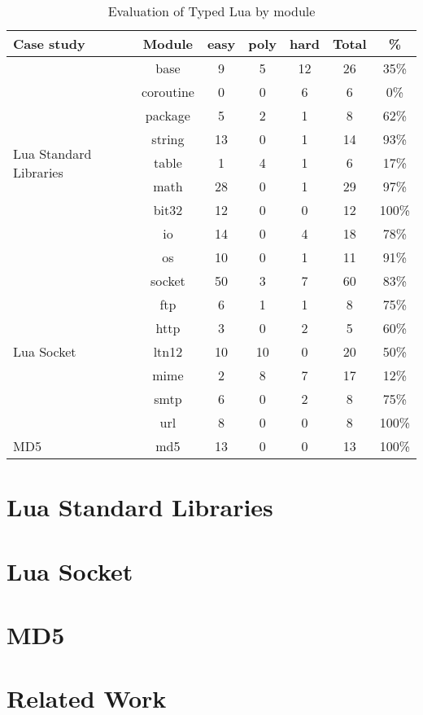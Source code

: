 \begin{table}[!ht]
\begin{center}
\begin{tabular}{|l|c|c|c|c|c|c|}
\hline
\textbf{Case study} & \textbf{Module} & \textbf{easy} & \textbf{poly} & \textbf{hard} & \textbf{Total} & \textbf{\%} \\
\hline
\multirow{9}{*}{Lua Standard Libraries}
& base & 9 & 5 & 12 & 26 & 35\% \\
\cline{2-7}
& coroutine & 0 & 0 & 6 & 6 & 0\% \\
\cline{2-7}
& package & 5 & 2 & 1 & 8 & 62\% \\
\cline{2-7}
& string & 13 & 0 & 1 & 14 & 93\% \\
\cline{2-7}
& table & 1 & 4 & 1 & 6 & 17\% \\
\cline{2-7}
& math & 28 & 0 & 1 & 29 & 97\% \\
\cline{2-7}
& bit32 & 12 & 0 & 0 & 12 & 100\% \\
\cline{2-7}
& io & 14 & 0 & 4 & 18 & 78\% \\
\cline{2-7}
& os & 10 & 0 & 1 & 11 & 91\% \\
\hline
\multirow{7}{*}{Lua Socket}
& socket & 50 & 3 & 7 & 60 & 83\% \\
\cline{2-7}
& ftp & 6 & 1 & 1 & 8 & 75\% \\
\cline{2-7}
& http & 3 & 0 & 2 & 5 & 60\% \\
\cline{2-7}
& ltn12 & 10 & 10 & 0 & 20 & 50\% \\
\cline{2-7}
& mime & 2 & 8 & 7 & 17 & 12\% \\
\cline{2-7}
& smtp & 6 & 0 & 2 & 8 & 75\% \\
\cline{2-7}
& url & 8 & 0 & 0 & 8 & 100\% \\
\hline
\multirow{1}{*}{MD5}
& md5 & 13 & 0 & 0 & 13 & 100\% \\
\hline
\end{tabular}
\end{center}
\caption{Evaluation of Typed Lua by module}
\label{tab:evalbymod}
\end{table}

\section{Lua Standard Libraries}

\section{Lua Socket}

\section{MD5}

\section{Related Work}
